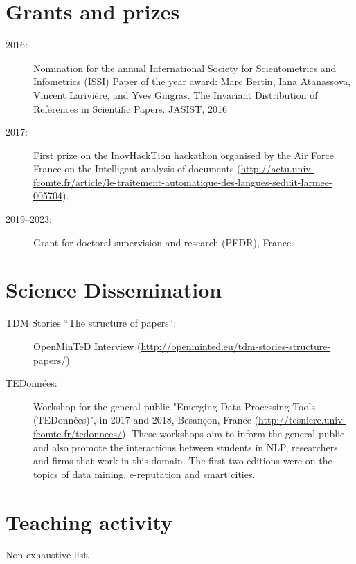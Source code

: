 \documentclass[11pt,a4paper,roman]{moderncv}
\begin{document}
\section{Grants and prizes}

\begin{description}
\item[2016:] Nomination for the annual International Society for Scientometrics and Infometrics (ISSI) Paper of the year award: Marc Bertin, Iana Atanassova, Vincent Larivière, and Yves Gingras. The Invariant Distribution of References in Scientific Papers. JASIST, 2016

\item[2017:] First prize on the InovHackTion hackathon organised by the Air Force France on the Intelligent analysis of documents (\url{http://actu.univ-fcomte.fr/article/le-traitement-automatique-des-langues-seduit-larmee-005704}).

\item[2019--2023:] Grant for doctoral supervision and research (PEDR), France.
\end{description}




\section{Science Dissemination}

\begin{description}

	\item[TDM Stories “The structure of papers“:] OpenMinTeD Interview (\url{http://openminted.eu/tdm-stories-structure-papers/})
	\item[TEDonnées:] Workshop for the general public "Emerging Data Processing Tools (TEDonnées)", in 2017 and 2018, Besançon, France (\url{http://tesniere.univ-fcomte.fr/tedonnees/}). These workshops aim to inform the general public and also promote the interactions between students in NLP, researchers and firms that work in this domain. The first two editions were on the topics of data mining, e-reputation and smart cities.

\end{description}



\section{Teaching activity}

Non-exhaustive list.
\end{document}

